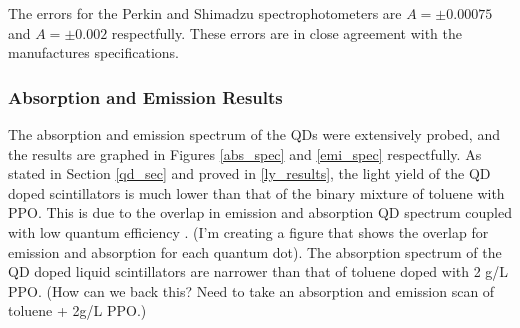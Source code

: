 \documentclass{JINST}
\begin{document}
The errors for the Perkin and Shimadzu spectrophotometers are $A=\pm0.00075$ and $A=\pm0.002$ respectfully. These errors are in close agreement with the manufactures specifications\cite{?}.

\subsubsection{Absorption and Emission Results}\label{abs_emi_results}
The absorption and emission spectrum of the QDs were extensively probed, and the results are graphed in Figures \ref{abs_spec} and \ref{emi_spec} respectfully. As stated in Section \ref{qd_sec} and proved in \ref{ly_results}, the light yield of the QD doped scintillators is much lower than that of the binary mixture of toluene with PPO. This is due to the overlap in emission and absorption QD spectrum coupled with low quantum efficiency \cite{lindley14}. (I'm creating a figure that shows the overlap for emission and absorption for each quantum dot). The absorption spectrum of the QD doped liquid scintillators are narrower than that of toluene doped with 2 g/L PPO.
(How can we back this? Need to take an absorption and emission scan of toluene + 2g/L PPO.)
\end{document}
